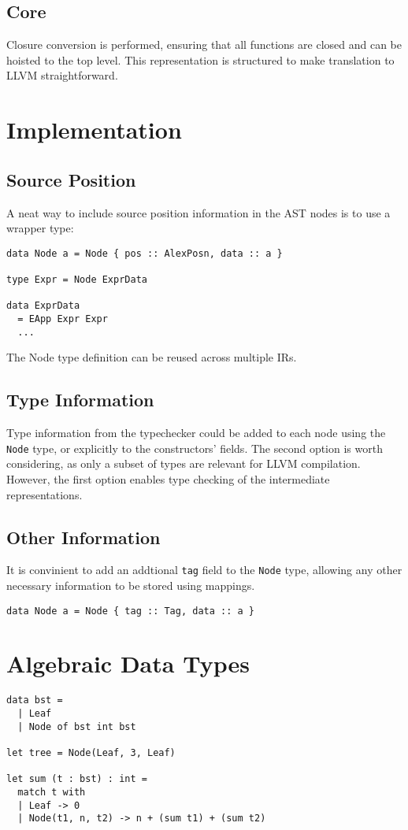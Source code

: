 \documentclass{article}
\begin{document}
\subsection{Core}
Closure conversion is performed, ensuring that all functions are closed and can be hoisted to the top level.
This representation is structured to make translation to LLVM straightforward.

\section{Implementation}

\subsection{Source Position}
A neat way to include source position information in the AST nodes is to use a wrapper type:
\begin{verbatim}
data Node a = Node { pos :: AlexPosn, data :: a }

type Expr = Node ExprData

data ExprData
  = EApp Expr Expr
  ...
\end{verbatim}
The Node type definition can be reused across multiple IRs.

\subsection{Type Information}
Type information from the typechecker could be added to each node using the \texttt{Node} type, or explicitly to the constructors' fields. 
The second option is worth considering, as only a subset of types are relevant for LLVM compilation.
However, the first option enables type checking of the intermediate representations.

\subsection{Other Information}
It is convinient to add an addtional \texttt{tag} field to the \texttt{Node} type, allowing any other necessary information to be stored using mappings.
\begin{verbatim}
data Node a = Node { tag :: Tag, data :: a }
\end{verbatim}

\section{Algebraic Data Types}
\begin{verbatim}
data bst = 
  | Leaf
  | Node of bst int bst

let tree = Node(Leaf, 3, Leaf)

let sum (t : bst) : int = 
  match t with
  | Leaf -> 0
  | Node(t1, n, t2) -> n + (sum t1) + (sum t2)
\end{verbatim}
\end{document}
